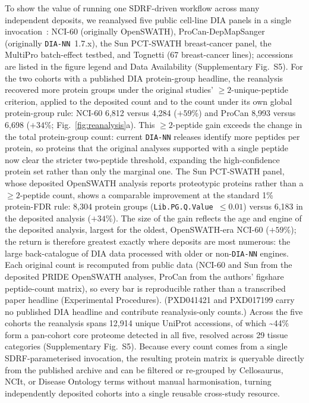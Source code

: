 \documentclass[preprint,12pt]{elsarticle}
\begin{document}
To show the value of running one SDRF-driven workflow across many independent deposits, we reanalysed five public cell-line DIA panels in a single \quantmsdiann{} invocation~\cite{guo2019nci60,goncalves2022procan,sun2023breast,wang2023multipro,tognetti2021breast}: NCI-60 (originally OpenSWATH), ProCan-DepMapSanger (originally \texttt{DIA-NN}~1.7.x), the Sun PCT-SWATH breast-cancer panel, the MultiPro batch-effect testbed, and Tognetti (67 breast-cancer lines); accessions are listed in the figure legend and Data Availability (Supplementary Fig.~S5).
For the two cohorts with a published DIA protein-group headline, the reanalysis recovered more protein groups under the original studies' $\geq 2$-unique-peptide criterion, applied to the deposited count and to the \quantmsdiann{} count under its own global protein-group rule: NCI-60 6{,}812 versus 4{,}284 ($+59$\%) and ProCan 8{,}993 versus 6{,}698 ($+34$\%; Fig.~\ref{fig:reanalysis}a). This $\geq 2$-peptide gain exceeds the change in the total protein-group count: current \texttt{DIA-NN} releases identify more peptides per protein, so proteins that the original analyses supported with a single peptide now clear the stricter two-peptide threshold, expanding the high-confidence protein set rather than only the marginal one. The Sun PCT-SWATH panel, whose deposited OpenSWATH analysis reports proteotypic proteins rather than a $\geq 2$-peptide count, shows a comparable improvement at the standard 1\% protein-FDR rule: 8{,}304 \quantmsdiann{} protein groups (\texttt{Lib.PG.Q.Value}~$\leq 0.01$) versus 6{,}183 in the deposited analysis ($+34$\%). The size of the gain reflects the age and engine of the deposited analysis, largest for the oldest, OpenSWATH-era NCI-60 ($+59$\%); the return is therefore greatest exactly where deposits are most numerous: the large back-catalogue of DIA data processed with older or non-\texttt{DIA-NN} engines. Each original count is recomputed from public data (NCI-60 and Sun from the deposited PRIDE OpenSWATH analyses, ProCan from the authors' figshare peptide-count matrix), so every bar is reproducible rather than a transcribed paper headline (Experimental Procedures). (PXD041421 and PXD017199 carry no published DIA headline and contribute reanalysis-only counts.)
Across the five cohorts the reanalysis spans 12{,}914 unique UniProt accessions, of which \textasciitilde 44\% form a pan-cohort core proteome detected in all five, resolved across 29 tissue categories (Supplementary Fig.~S5). Because every count comes from a single SDRF-parameterised invocation, the resulting protein matrix is queryable directly from the published \qpx{} archive and can be filtered or re-grouped by Cellosaurus, NCIt, or Disease Ontology terms without manual harmonisation, turning independently deposited cohorts into a single reusable cross-study resource.
\end{document}

